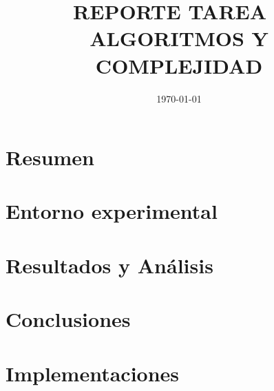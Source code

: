 \documentclass[11pt,spanish]{article} %
\author{\namestudent}
\title{
  \huge
  \textbf{REPORTE TAREA \tnum~ \\ ALGORITMOS Y COMPLEJIDAD} \\[1ex]
  \emph{\textquote{¿Quien ganará? Greedys vs Dinámico vs Bruto.}}
}
\date{
  \small
  \today\\
  \currenttime
}
\begin{document}
\maketitle
\thispagestyle{fancy}
\vspace{-1.0\baselineskip}

\section{Resumen}


\section{Entorno experimental}


\section{Resultados y Análisis}


\section{Conclusiones}


\clearpage
\section{Implementaciones}


\printbibliography
\end{document}
